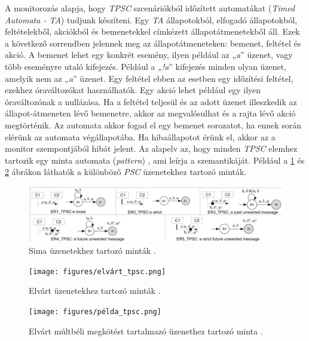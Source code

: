 A monitorozás alapja, hogy \textit{TPSC} szcenáriókból időzített automatákat (\textit{Timed Automata - TA}) tudjunk készíteni.
Egy \textit{TA} állapotokból, elfogadó állapotokból, feltételekből, akciókból és bemenetekkel címkézett állapotátmenetekből áll.
Ezek a következő sorrendben jelennek meg az állapotátmeneteken: bemenet, feltétel és akció.
A bemenet lehet egy konkrét esemény, ilyen például az „\textit{a}” üzenet, vagy több eseményre utaló kifejezés.
Például a „\textit{!a}” kifejezés minden olyan üzenet, amelyik nem az „\textit{a}” üzenet.
Egy feltétel ebben az esetben egy időzítési feltétel, ezekhez óraváltozókat használhatók.
Egy akció lehet például egy ilyen óraváltozónak a nullázása.
Ha a feltétel teljesül és az adott üzenet illeszkedik az állapot-átmeneten lévő bemenetre, akkor az megvalósulhat és a rajta lévő akció megtörténik.
Az automata akkor fogad el egy bemenet sorozatot, ha ennek során elérünk az automata végállapotába.
Ha hibaállapotot érünk el, akkor az a monitor szempontjából hibát jelent.
Az alapelv az, hogy minden \textit{TPSC} elemhez tartozik egy minta automata (\textit{pattern}) \cite{TPSC1}, ami leírja a szemantikáját.
Például a \ref{tpsc_sima} és \ref{tpsc_elvárt} ábrákon láthatók a különböző \textit{PSC} üzenetekhez tartozó minták.

\begin{figure}[!ht]
    \centering
    \includegraphics[width=150mm, keepaspectratio]{figures/sima_tpsc.png}
    \caption{Sima üzenetekhez tartozó minták \cite{TPSC1}.}
    \label{tpsc_sima}
\end{figure}

\begin{figure}[!ht]
    \centering
    \texttt{[image: figures/elvárt\_tpsc.png]}
    \caption{Elvárt üzenetekhez tartozó minták \cite{TPSC1}.}
    \label{tpsc_elvárt}
\end{figure}

\begin{figure}[!ht]
    \centering
    \texttt{[image: figures/példa\_tpsc.png]}
    \caption{Elvárt múltbéli megkötést tartalmazó üzenethez tartozó minta \cite{TPSC1}.}
    \label{tpsc_példa}
\end{figure}

